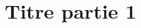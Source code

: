 \documentclass[11pt,a4paper,table]{Classe_SYMME}
\begin{document}
\setcounter{page}{1}



\pageblanchenoheader


\part{Titre partie 1}
\label{pt:I}


\pageblanchenoheader
\newpage 


\pageblanchenoheader
\newpage 



%    

%  



%  

%  

\end{document}
